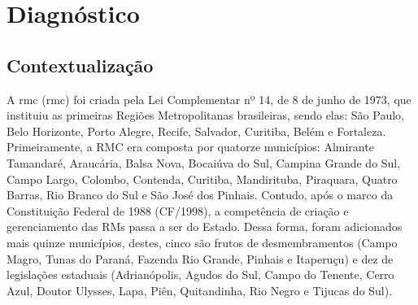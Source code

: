 	
	
	\tableofcontents 
	\newpage \listoffigures
	\newpage \listoftables
	\textual
	
	
	
	
	\chapter{Diagnóstico}
	
	\section{Contextualização}
	
	A \glsdesc{rmc} (\gls{rmc}) foi criada pela Lei Complementar  nº 14, de 8 de junho de 1973, que instituiu as primeiras Regiões Metropolitanas brasileiras, sendo elas: São Paulo, Belo Horizonte, Porto Alegre, Recife, Salvador, Curitiba, Belém e Fortaleza. Primeiramente, a RMC era composta por quatorze municípios: Almirante Tamandaré, Araucária, Balsa Nova, Bocaiúva do Sul, Campina Grande do Sul, Campo Largo, Colombo, Contenda, Curitiba, Mandirituba, Piraquara, Quatro Barras, Rio Branco do Sul e São José dos Pinhais. Contudo, após o marco da Constituição Federal de 1988 (CF/1998), a competência de criação e gerenciamento das RMs passa a ser do Estado. Dessa forma, foram adicionados mais quinze municípios, destes, cinco são frutos de desmembramentos (Campo Magro, Tunas do Paraná, Fazenda Rio Grande, Pinhais e Itaperuçu) e dez de legislações estaduais (Adrianópolis, Agudos do Sul, Campo do Tenente, Cerro Azul, Doutor Ulysses, Lapa, Piên, Quitandinha, Rio Negro e Tijucas do Sul).
	
